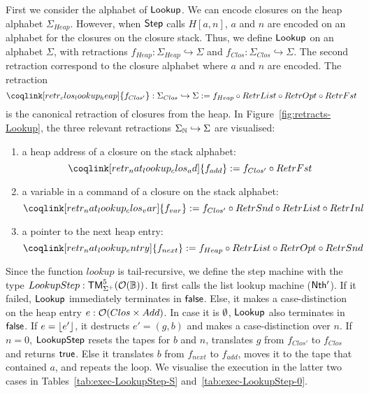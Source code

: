 First we consider the alphabet of $\mathsf{Lookup}$.  We can encode closures on the heap alphabet $\Sigma_{Heap}$.  However, when $\mathsf{Step}$ calls
$H[a,n]$, $a$ and $n$ are encoded on an alphabet for the closures on the closure stack.  Thus, we define $\mathsf{Lookup}$ on an alphabet $\Sigma$, with
retractions $f_{Heap} : \Sigma_{Heap} \hookrightarrow \Sigma$ and $f_{Clos} : \Sigma_{Clos} \hookrightarrow \Sigma$.  The second retraction correspond
to the closure alphabet where $a$ and $n$ are encoded.  The retraction
\[
  \coqlink[retr_clos_lookup_heap]{f_{Clos'}} : \Sigma_{Clos} \hookrightarrow \Sigma := f_{Heap} \circ RetrList \circ RetrOpt \circ RetrFst 
\]
is the canonical retraction of closures from the heap.  In Figure~\ref{fig:retracts-Lookup}, the three relevant retractions
$\Sigma_{\mathbb{N}} \hookrightarrow \Sigma$ are visualised:
\begin{enumerate}
\item a heap address of a closure on the stack alphabet:
  \[
    \coqlink[retr_nat_lookup_clos_ad]{f_{add}} := f_{Clos'} \circ RetrFst
  \]
\item a variable in a command of a closure on the stack alphabet:
  \[
    \coqlink[retr_nat_lookup_clos_var]{f_{var}} := f_{Clos'} \circ RetrSnd \circ RetrList \circ RetrInl
  \]
\item a pointer to the next heap entry:
  \[
    \coqlink[retr_nat_lookup_entry]{f_{next}} :=  f_{Heap} \circ RetrList \circ RetrOpt \circ RetrSnd 
  \]
\end{enumerate}

Since the function $lookup$ is tail-recursive, we define the step machine with the type $LookupStep : \mathsf{TM}_{\Sigma^+}^5(\mathcal{O}(\mathbb{B}))$.  It first
calls the list lookup machine ($\mathsf{Nth'}$).  If it failed, $\mathsf{Lookup}$ immediately terminates in $\mathsf{false}$.  Else, it makes a case-distinction on
the heap entry $e : \mathcal{O}(Clos \times Add)$.  In case it is $\emptyset$, $\mathsf{Lookup}$ also terminates in $\mathsf{false}$.  If $e = \left\lfloor {e'} \right\rfloor$, it destructs
$e' = (g,b)$ and makes a case-distinction over $n$.  If $n=0$, $\mathsf{LookupStep}$ resets the tapes for $b$ and $n$, translates $g$ from $f_{Clos'}$ to
$f_{Clos}$ and returns $\mathsf{true}$.  Else it translates $b$ from $f_{next}$ to $f_{add}$, moves it to the tape that contained $a$, and repeats the loop.
We visualise the execution in the latter two cases in Tables~\ref{tab:exec-LookupStep-S} and~\ref{tab:exec-LookupStep-0}.

\enlargethispage{0.5cm}

